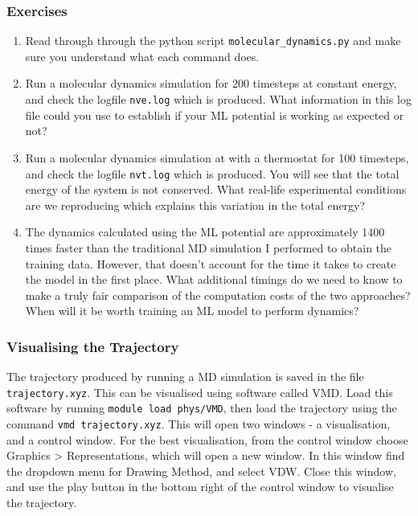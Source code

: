 \documentclass{article}
\begin{document}
\subsubsection*{Exercises}

\begin{enumerate}

\item Read through through the python script \verb|molecular_dynamics.py| and make sure you understand what each command does.
\item Run a molecular dynamics simulation for 200 timesteps at constant energy, and check the logfile \verb|nve.log| which is produced. What information in this log file could you use to establish if your ML potential is working as expected or not?
\item Run a molecular dynamics simulation at with a thermostat for 100 timesteps, and check the logfile \verb|nvt.log| which is produced. You will see that the total energy of the system is not conserved. What real-life experimental conditions are we reproducing which explains this variation in the total energy?
\item The dynamics calculated using the ML potential are approximately 1400 times faster than the traditional MD simulation I performed to obtain the training data. However, that doesn't account for the time it takes to create the model in the first place. What additional timings do we need to know to make a truly fair comparison of the computation costs of the two approaches? When will it be worth training an ML model to perform dynamics?

\end{enumerate}


\subsubsection*{Visualising the Trajectory}

The trajectory produced by running a MD simulation is saved in the file \verb|trajectory.xyz|. This can be visualised using software called VMD. Load this software by running \verb|module load phys/VMD|, then load the trajectory using the command \verb|vmd trajectory.xyz|. This will open two windows - a visualisation, and a control window. For the best visualisation, from the control window choose Graphics > Representations, which will open a new window. In this window find the dropdown menu for Drawing Method, and select VDW. Close this window, and use the play button in the bottom right of the control window to visualise the trajectory.
\end{document}
